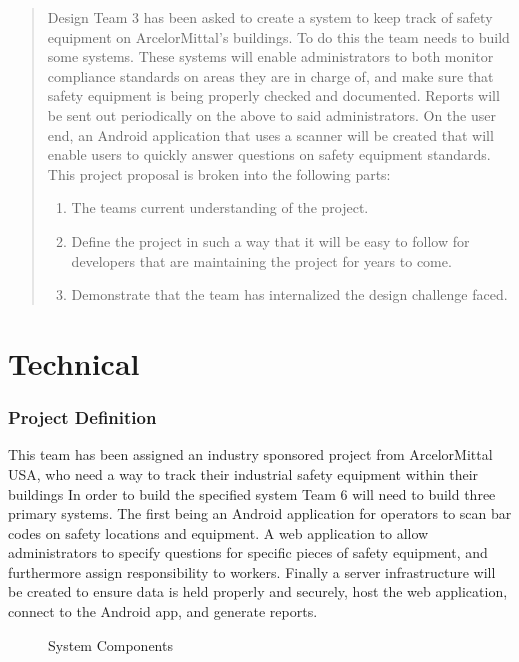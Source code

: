 \documentclass[Letter,11pt]{article}
\begin{document}
	
			\tableofcontents
			\listoffigures
			\begingroup
			\let\clearpage\relax
			\listoftables
			\endgroup
			\newpage
	\begin{abstract}
		Design Team 3 has been asked to create a system to keep track of safety equipment on ArcelorMittal's buildings. To do this the team needs to build some systems. These systems will enable administrators to both monitor compliance standards on areas they are in charge of, and make sure that safety equipment is being properly checked and documented. Reports will be sent out periodically on the above to said administrators.  On the user end, an Android application  that uses a scanner will be created that will enable users to quickly answer questions on safety equipment standards.  This project proposal is broken into the following parts:
		\begin{enumerate}
			\item The teams current understanding of the project.
			\item Define the project in such a way that it will be easy to follow for developers that are maintaining the project for years to come.
			\item Demonstrate that the team has internalized the design challenge faced.
		\end{enumerate}
	\end{abstract}
	
\part{Technical}
\section{Project Definition}\label{def}
	This team has been assigned an industry sponsored project from ArcelorMittal USA, who need a way to track their industrial safety equipment within their buildings In order to build the specified system Team 6 will need to build three primary systems. The first being an Android application for operators to scan bar codes on safety locations and equipment. A web application to allow administrators to specify questions for specific pieces of safety equipment, and furthermore assign responsibility to workers. Finally a server infrastructure will be created to ensure data is held properly and securely, host the web application, connect to the Android app, and generate reports. 
			
	\begin{figure}[h]
		\centering
		
		\caption{\label{sysConn} System Components}
	\end{figure}
	
\end{document}
